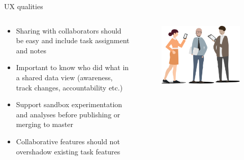 \documentclass[aspectratio=169]{beamer}
\begin{document}
\begin{frame}{UX qualities}
    \begin{columns}
        \begin{column}{0.6\textwidth}
            \small
            \begin{itemize}
                \item Sharing with collaborators should be easy and include task assignment and notes
                \item Important to know who did what in a shared data view (awareness, track changes, accountability etc.)
                \item Support sandbox experimentation and analyses before publishing or merging to master
                \item Collaborative features should not overshadow existing task features
            \end{itemize}
        \end{column}
        \begin{column}{0.4\textwidth}
            \begin{figure}[h]
                \centering
                \includegraphics[width=1\textwidth]{images/Users.png}
            \end{figure}
        \end{column}
    \end{columns}
\end{frame}
\end{document}
